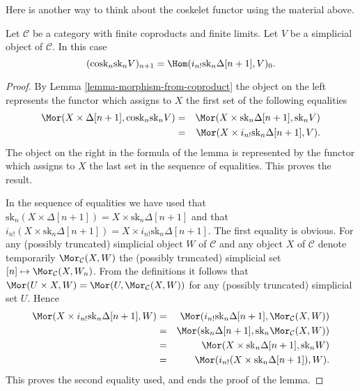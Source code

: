 \noindent
Here is another way to think about the coskelet functor
using the material above.

\begin{lemma}
\label{lemma-cosk-shriek}
Let $\mathcal{C}$ be a category with finite coproducts
and finite limits. Let $V$ be a simplicial object of $\mathcal{C}$.
In this case
$$
(\text{cosk}_n \text{sk}_n V)_{n + 1}
=
\Hom(i_{n !}\text{sk}_n \Delta[n + 1], V)_0.
$$
\end{lemma}

\begin{proof}
By Lemma \ref{lemma-morphism-from-coproduct}
the object on the left represents the functor
which assigns to $X$ the first set of the following
equalities
\begin{eqnarray*}
\Mor(X \times \Delta[n + 1], \text{cosk}_n \text{sk}_n V)
& = &
\Mor(X \times \text{sk}_n \Delta[n + 1], \text{sk}_n V) \\
& = &
\Mor(X \times i_{n !} \text{sk}_n \Delta[n + 1], V).
\end{eqnarray*}
The object on the right in the formula of the lemma
is represented by the functor which assigns to $X$
the last set in the sequence of equalities.
This proves the result.

\medskip\noindent
In the sequence of equalities we have used that
$\text{sk}_n (X \times \Delta[n + 1]) = X \times \text{sk}_n \Delta[n + 1]$
and that
$i_{n!}(X \times \text{sk}_n \Delta[n + 1]) =
X \times i_{n !} \text{sk}_n \Delta[n + 1]$.
The first equality is obvious. For any (possibly truncated)
simplicial object $W$
of $\mathcal{C}$ and any object $X$ of $\mathcal{C}$
denote temporarily $\Mor_\mathcal{C}(X, W)$ the
(possibly truncated) simplicial set
$[n] \mapsto \Mor_\mathcal{C}(X, W_n)$. From the definitions
it follows that $\Mor(U \times X, W) =
\Mor(U, \Mor_\mathcal{C}(X, W))$ for any
(possibly truncated) simplicial set $U$. Hence
\begin{eqnarray*}
\Mor(X \times i_{n !} \text{sk}_n \Delta[n + 1], W)
& = &
\Mor(i_{n !} \text{sk}_n \Delta[n + 1], \Mor_\mathcal{C}(X, W)) \\
& = &
\Mor(\text{sk}_n \Delta[n + 1],
\text{sk}_n\Mor_\mathcal{C}(X, W)) \\
& = &
\Mor(X \times \text{sk}_n \Delta[n + 1], \text{sk}_nW) \\
& = &
\Mor(i_{n!}(X \times \text{sk}_n \Delta[n + 1]), W).
\end{eqnarray*}
This proves the second equality used, and ends the proof of the lemma.
\end{proof}


